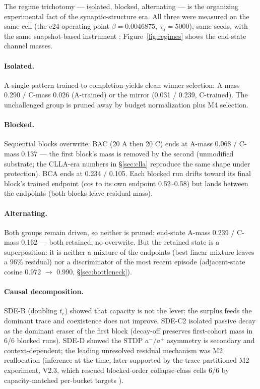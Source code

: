 The regime trichotomy --- isolated, blocked, alternating --- is the
organizing experimental fact of the synaptic-structure era. All three
were measured on the same cell (the e24 operating point
\(\beta=0.0046875,\ \tau_s=5000\)), same seeds, with the same
snapshot-based instrument \cite{synmem}; Figure~\ref{fig:regimes} shows
the end-state channel masses.

\paragraph{Isolated.} A single pattern trained to completion yields
clean winner selection: A-mass 0.290 / C-mass 0.026 (A-trained) or the
mirror (0.031 / 0.239, C-trained). The unchallenged group is pruned
away by budget normalization plus M4 selection.

\paragraph{Blocked.} Sequential blocks overwrite: BAC (20 A then 20 C)
ends at A-mass 0.068 / C-mass 0.137 --- the first block's mass is
removed by the second (unmodified substrate; the CLLA-era numbers in
\S\ref{sec:clla} reproduce the same shape under protection). BCA ends
at 0.234 / 0.105. Each blocked run drifts toward its final block's
trained endpoint (cos to its own endpoint 0.52--0.58) but lands between
the endpoints (both blocks leave residual mass).

\paragraph{Alternating.} Both groups remain driven, so neither is
pruned: end-state A-mass 0.239 / C-mass 0.162 --- both retained, no
overwrite. But the retained state is a superposition: it is neither a
mixture of the endpoints (best linear mixture leaves a 96\% residual)
nor a discriminator of the most recent episode (adjacent-state cosine
0.972 \(\to\) 0.990, \S\ref{sec:bottleneck}).

\paragraph{Causal decomposition.} SDE-B (doubling \(t_e\)) showed that
capacity is not the lever: the surplus feeds the dominant trace and
coexistence does not improve. SDE-C2 isolated passive decay as the
dominant eraser of the first block (decay-off preserves first-cohort
mass in 6/6 blocked runs). SDE-D showed the STDP \(a^-/a^+\)
asymmetry is secondary and context-dependent; the leading unresolved
residual mechanism was M2 reallocation (inference at the time, later
supported by the trace-partitioned M2 experiment, V2.3, which rescued
blocked-order collapse-class cells 6/6 by capacity-matched per-bucket
targets \cite{overview}).

